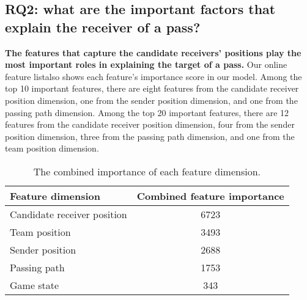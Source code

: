 \subsection{RQ2: what are the important factors that explain the receiver of a pass?}\label{RQ3-results}

\textbf{The features that capture the candidate receivers' positions play the most important roles in explaining the target of a pass.}
Our online feature list\footnotemark[\ref{feature-list}] also shows each feature's importance score in our model.
Among the top 10 important features, there are eight features from the candidate receiver position dimension, one from the sender position dimension, and one from the passing path dimension.
Among the top 20 important features, there are 12 features from the candidate receiver position dimension, four from the sender position dimension, three from the passing path dimension, and one from the team position dimension.

\begin{table}[!t]
\caption{The combined importance of each feature dimension.}
\centering
\begin{tabular}{lc}
  \toprule
  Feature dimension & Combined feature importance \\
  \midrule
  Candidate receiver position & 6723 \\
  Team position & 3493 \\
  Sender position & 2688 \\
  Passing path & 1753 \\
  Game state & 343 \\
  \bottomrule
\end{tabular}
\label{tab:combined-feature-importance}
\end{table}